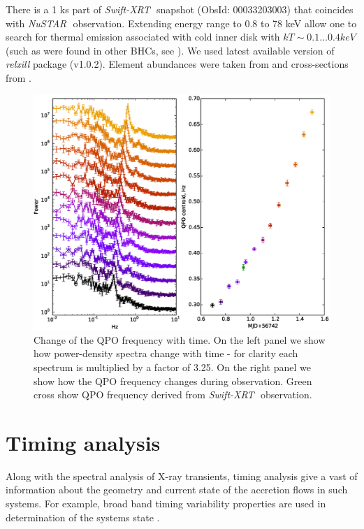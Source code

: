 \documentclass[a4paper,fleqn,usenatbib]{mnras}
\def\swiftx{{\em Swift-XRT\,}}
\def\nustar{{\em NuSTAR\,}}
\begin{document}
There is a 1 ks part of \swiftx\, snapshot (ObsId: 00033203003) that coincides with \nustar\, observation.  Extending energy range to 0.8 to 78 keV allow one to search for thermal emission associated with cold inner disk with $kT \sim 0.1...0.4 keV$ (such as were found in other BHCs, see \cite[][ e.t.c]{miller06b,miller06a,parker15}).
We used latest available version of {\it relxill} package (v1.0.2). 
Element abundances were taken from \cite{wilms00} and cross-sections from \cite{verner96}.

\begin{figure}
\centerline{\includegraphics[scale=0.7]{QPOdrift_v02.eps}}
\caption{Change of the QPO frequency with time. On the left panel we show how power-density spectra change with time - for clarity each spectrum is multiplied by a factor of 3.25. On the right panel we show how the QPO frequency changes during observation. Green cross show QPO frequency derived from \swiftx\, observation.} 
\label{fig:qpodrift}
\end{figure}  


\section{Timing analysis} 

    Along with the spectral analysis of X-ray transients, timing analysis give a vast of information about the geometry and current state of the accretion flows in such systems. 
For example, broad band timing variability properties are used in determination of the systems state \cite{2005Ap&SS.300..107H}.
\end{document}
